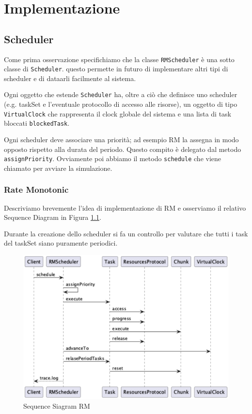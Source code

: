 \chapter{Implementazione}

\section{Scheduler}
Come prima osservazione specifichiamo che la classe \texttt{RMScheduler} è una sotto classe di \texttt{Scheduler}. questo permette in futuro di implementare altri tipi di scheduler e di dataarli facilmente al sistema.

Ogni oggetto che estende \texttt{Scheduler} ha, oltre a ciò che definisce uno scheduler (e.g. taskSet e l'eventuale protocollo di accesso alle risorse), un oggetto di tipo \texttt{VirtualClock} che rappresenta il clock globale del sistema e una lista di task bloccati \texttt{blockedTask}.

Ogni scheduler deve associare una priorità; ad esempio RM la assegna in modo opposto rispetto alla durata del periodo. Questo compito è delegato dal metodo \texttt{assignPriority}. Ovviamente poi abbiamo il metodo \texttt{schedule} che viene chiamato per avviare la simulazione.

\subsection{Rate Monotonic}
Descriviamo brevemente l'idea di implementazione di RM e osserviamo il relativo Sequence Diagram in Figura \ref{fig:sdRM}.

Durante la creazione dello scheduler si fa un controllo per valutare che tutti i task del taskSet siano puramente periodici.

\begin{figure}[htbp]
    \centering
    \includegraphics[width=1\textwidth]{immagini/sequence diagram RM.pdf}
    \caption{Sequence Siagram RM}
    \label{fig:sdRM}
\end{figure}


